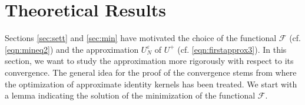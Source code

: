 \documentclass[a4paper, 10pt]{article}
\numberwithin{equation}{section}
\theoremstyle{definition}
\newcommand{\eps}{\ensuremath{\varepsilon}}
\begin{document}
\section{Theoretical Results}\label{sec:theo}%

Sections \ref{sec:sett} and \ref{sec:min} have motivated the choice of the functional $\mathcal{F}$ (cf. \eqref{eqn:mineq2}) and the approximation $U_N^\eps$ of $U^+$ (cf. \eqref{eqn:firstapprox3}). In this section, we want to study the approximation more rigorously with respect to its convergence. The general idea for the proof of the convergence stems from \cite{michel11} where the optimization of approximate identity kernels has been treated. We start with a lemma indicating the solution of the minimization of the functional $\mathcal{F}$.
\end{document}
